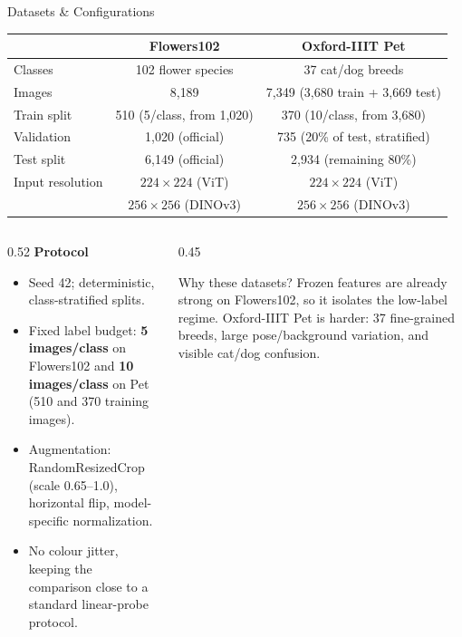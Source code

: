 \documentclass[10pt, aspectratio=169]{beamer}
\begin{document}
\begin{frame}[t]{Datasets \& Configurations}
  \centering
  \small
  \setlength{\tabcolsep}{5pt}
  \begin{tabular}{lcc}
    \toprule
    & \textbf{Flowers102} & \textbf{Oxford-IIIT Pet} \\
    \midrule
    Classes & 102 flower species & 37 cat/dog breeds \\
    Images & 8{,}189 & 7{,}349 (3{,}680 train + 3{,}669 test) \\
    Train split & 510 (5/class, from 1{,}020) & 370 (10/class, from 3{,}680) \\
    Validation & 1{,}020 (official) & 735 (20\% of test, stratified) \\
    Test split & 6{,}149 (official) & 2{,}934 (remaining 80\%) \\
    Input resolution & $224\times224$ (ViT) & $224\times224$ (ViT) \\
                       & $256\times256$ (DINOv3) & $256\times256$ (DINOv3) \\
    \bottomrule
  \end{tabular}

  \vspace{0.25cm}
  \begin{columns}[T]
    \begin{column}{0.52\textwidth}
      \footnotesize
      \textbf{Protocol}
      \begin{itemize}
        \item Seed 42; deterministic, class-stratified splits.
        \item Fixed label budget: \textbf{5 images/class} on Flowers102 and \textbf{10 images/class} on Pet (510 and 370 training images).
        \item Augmentation: RandomResizedCrop (scale 0.65--1.0), horizontal flip, model-specific normalization.
        \item No colour jitter, keeping the comparison close to a standard linear-probe protocol.
      \end{itemize}
    \end{column}
    \begin{column}{0.45\textwidth}
      \begin{block}{Why these datasets?}
        \footnotesize
        Frozen features are already strong on Flowers102, so it isolates the low-label regime. Oxford-IIIT Pet is harder: 37 fine-grained breeds, large pose/background variation, and visible cat/dog confusion.
      \end{block}
    \end{column}
  \end{columns}
\end{frame}
\end{document}
